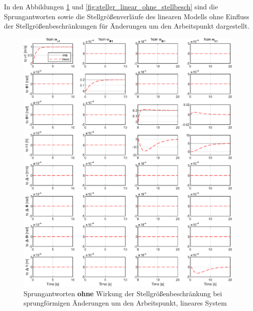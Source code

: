 In den Abbildungen \ref{fig:outputs_linear_ohne_stellbesch} und \ref{fig:stellgr_linear_ohne_stellbesch} sind die Sprungantworten sowie die Stellgrößenverläufe des linearen Modells ohne Einfluss der Stellgrößenbeschränkungen für Änderungen um den Arbeitspunkt dargestellt. 
\begin{figure}[H] %
	\centering
	\includegraphics[width=\linewidth]{./Bilder/outputs_lin_ohne_beschr_um_AP.eps}
	\caption{Sprungantworten \textbf{ohne} Wirkung der Stellgrößenbeschränkung bei sprungförmigen Änderungen um den Arbeitspunkt, lineares System}
	\label{fig:outputs_linear_ohne_stellbesch}
\end{figure}
